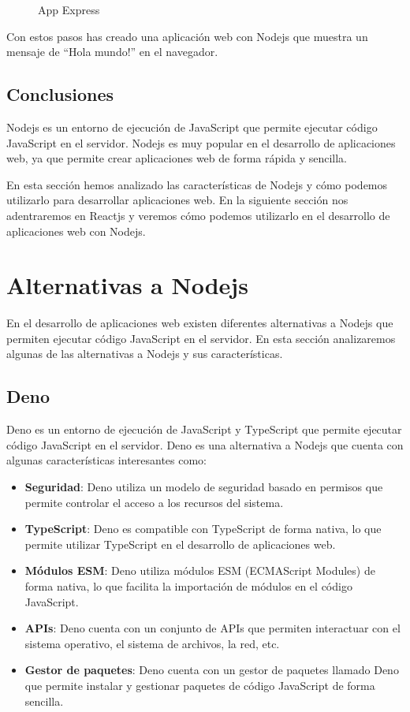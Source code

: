 \documentclass[
  a4paper,
  DIV=11,
  numbers=noendperiod,
  onepage,
  openany]{scrreprt}
\begin{document}
\begin{tcolorbox}
\begin{figure}[H]
{}

\caption{App Express}

\end{figure}%

Con estos pasos has creado una aplicación web con Nodejs que muestra un
mensaje de ``Hola mundo!'' en el navegador.

\section{Conclusiones}\label{conclusiones-2}

Nodejs es un entorno de ejecución de JavaScript que permite ejecutar
código JavaScript en el servidor. Nodejs es muy popular en el desarrollo
de aplicaciones web, ya que permite crear aplicaciones web de forma
rápida y sencilla.

En esta sección hemos analizado las características de Nodejs y cómo
podemos utilizarlo para desarrollar aplicaciones web. En la siguiente
sección nos adentraremos en Reactjs y veremos cómo podemos utilizarlo en
el desarrollo de aplicaciones web con Nodejs.

\chapter{Alternativas a Nodejs}\label{alternativas-a-nodejs}

En el desarrollo de aplicaciones web existen diferentes alternativas a
Nodejs que permiten ejecutar código JavaScript en el servidor. En esta
sección analizaremos algunas de las alternativas a Nodejs y sus
características.

\section{Deno}\label{deno}

Deno es un entorno de ejecución de JavaScript y TypeScript que permite
ejecutar código JavaScript en el servidor. Deno es una alternativa a
Nodejs que cuenta con algunas características interesantes como:

\begin{itemize}
\item
  \textbf{Seguridad}: Deno utiliza un modelo de seguridad basado en
  permisos que permite controlar el acceso a los recursos del sistema.
\item
  \textbf{TypeScript}: Deno es compatible con TypeScript de forma
  nativa, lo que permite utilizar TypeScript en el desarrollo de
  aplicaciones web.
\item
  \textbf{Módulos ESM}: Deno utiliza módulos ESM (ECMAScript Modules) de
  forma nativa, lo que facilita la importación de módulos en el código
  JavaScript.
\item
  \textbf{APIs}: Deno cuenta con un conjunto de APIs que permiten
  interactuar con el sistema operativo, el sistema de archivos, la red,
  etc.
\item
  \textbf{Gestor de paquetes}: Deno cuenta con un gestor de paquetes
  llamado Deno que permite instalar y gestionar paquetes de código
  JavaScript de forma sencilla.
\end{itemize}


\end{tcolorbox}
\end{document}

